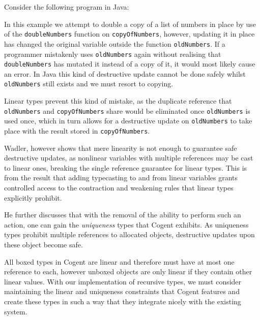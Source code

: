 Consider the following program in Java:



In this example we attempt to double a copy of a list of numbers in place by use of the \verb|doubleNumbers|
function on \verb|copyOfNumbers|, however, updating it in place has changed the original variable outside
the function \verb|oldNumbers|. If a programmer mistakenly uses \verb|oldNumbers| again without realising that
\verb|doubleNumbers| has mutated it instead of a copy of it, it would most likely cause an error. In 
Java this kind of destructive update cannot be done safely whilst \verb|oldNumbers| still exists and we
must resort to copying.

Linear types prevent this kind of mistake, as the duplicate reference that
\verb|oldNumbers| and \verb|copyOfNumbers| share would be eliminated once \verb|oldNumbers| is used once,
which in turn allows for a destructive update on \verb|oldNumbers| to take place with the result stored in
\verb|copyOfNumbers|.

Wadler, however shows that mere linearity is not enough to guarantee safe destructive updates, as nonlinear
variables with multiple references may be cast to linear ones, breaking the single reference guarantee
for linear types. This is from the result that adding typecasting to and from linear variables grants 
controlled access to the contraction and weakening rules that linear types explicitly prohibit.

He further discusses that with the removal of the ability to perform such an action,
one can gain the \textit{uniqueness} types that Cogent exhibits. 
As uniqueness types prohibit multiple references to allocated objects, 
destructive updates upon these object become safe.

All boxed types in Cogent are linear and therefore must have at most one reference to each,
however unboxed objects are only linear if they contain other linear values.
With our implementation of recursive types, we must consider maintaining the linear and uniqueness constraints
that Cogent features and create these types in such a way that they integrate nicely with the existing
system.

